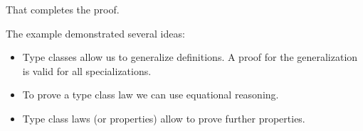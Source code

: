 That completes the proof.

The example demonstrated several ideas:
\begin{itemize}
\item Type classes allow us to generalize definitions. A proof for the generalization is valid for all specializations.
\item To prove a type class law we can use equational reasoning.
\item Type class laws (or properties) allow to prove further properties.
\end{itemize}


